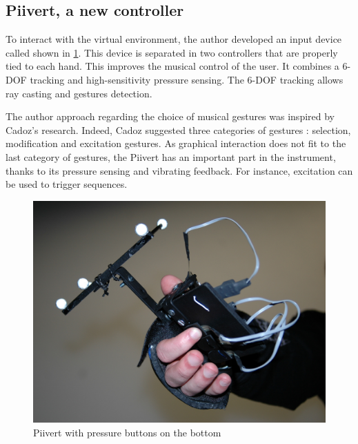 \subsection{Piivert, a new controller}
To interact with the virtual environment, the author developed an input device called  \cite{berthaut2010piivert} shown in \ref{fig:piivert}. This device is separated in two controllers that are properly tied to each hand. This improves the musical control of the user. It combines a 6-\ac{DOF} tracking and high-sensitivity pressure sensing.
The  6-\ac{DOF} tracking allows ray casting and gestures detection. 

The author approach regarding the choice of musical gestures was inspired by Cadoz's \cite{cadoz1999musique} research. Indeed, Cadoz suggested three categories of gestures : selection, modification and excitation gestures. As graphical interaction does not fit to the last category of gestures, the Piivert has an important part in the instrument, thanks to its pressure sensing and vibrating feedback. For instance, excitation can be used to trigger sequences.

\begin{figure}[h!]
\centering\includegraphics[scale=0.2]{image/piivert.jpg}
\caption{Piivert with pressure buttons on the bottom}
\label{fig:piivert}
\end{figure} 